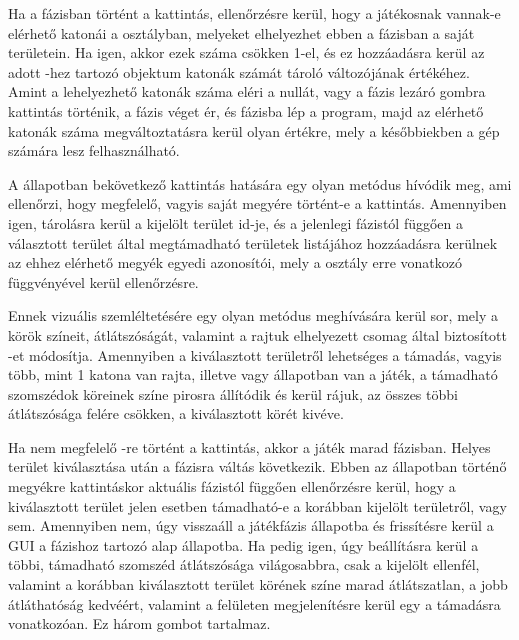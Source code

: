 Ha a  fázisban történt a kattintás, ellenőrzésre kerül, hogy a játékosnak vannak-e elérhető katonái a  osztályban, melyeket elhelyezhet ebben a fázisban a saját területein.
Ha igen, akkor ezek száma csökken 1-el, és ez hozzáadásra kerül az adott -hez tartozó  objektum katonák számát tároló változójának értékéhez.
Amint a lehelyezhető katonák száma eléri a nullát, vagy a fázis lezáró gombra kattintás történik, a  fázis véget ér, és  fázisba lép a program, majd az elérhető katonák száma megváltoztatásra kerül olyan értékre, mely a későbbiekben a gép számára lesz felhasználható. 

A  állapotban bekövetkező kattintás hatására egy olyan metódus hívódik meg, ami ellenőrzi, hogy megfelelő, vagyis saját megyére történt-e a kattintás.
Amennyiben igen, tárolásra kerül a kijelölt terület id-je, és a jelenlegi fázistól függően a választott terület által megtámadható területek listájához hozzáadásra kerülnek az ehhez elérhető megyék egyedi azonosítói, mely a  osztály erre vonatkozó függvényével kerül ellenőrzésre. 

Ennek vizuális szemléltetésére egy olyan metódus meghívására kerül sor, mely a körök színeit, átlátszóságát, valamint a rajtuk elhelyezett  csomag által biztosított -et módosítja.
Amennyiben a kiválasztott területről lehetséges a támadás, vagyis több, mint 1 katona van rajta, illetve  vagy  állapotban van a játék, a támadható szomszédok köreinek színe pirosra állítódik és  kerül rájuk, az összes többi átlátszósága felére csökken, a kiválasztott körét kivéve. 

Ha nem megfelelő -re történt a kattintás, akkor a játék marad  fázisban.
Helyes terület kiválasztása után a  fázisra váltás következik.
Ebben az állapotban történő megyékre kattintáskor aktuális fázistól függően ellenőrzésre kerül, hogy a kiválasztott terület jelen esetben támadható-e a korábban kijelölt területről, vagy sem.
Amennyiben nem, úgy visszaáll a játékfázis  állapotba és frissítésre kerül a GUI a fázishoz tartozó alap állapotba.
Ha pedig igen, úgy beállításra kerül a többi, támadható szomszéd átlátszósága világosabbra, csak a kijelölt ellenfél, valamint a korábban kiválasztott terület körének színe marad átlátszatlan, a jobb átláthatóság kedvéért, valamint a felületen megjelenítésre kerül egy  a támadásra vonatkozóan.
Ez három gombot tartalmaz. 

